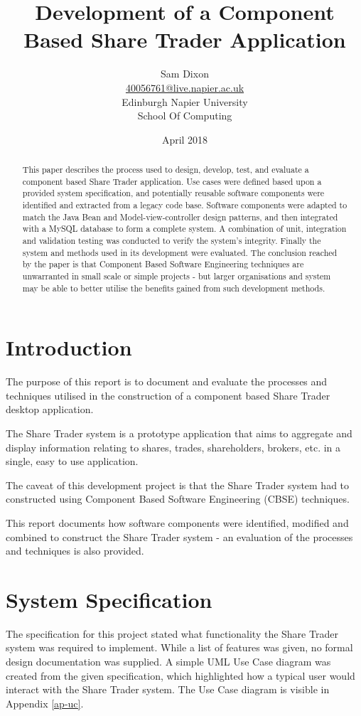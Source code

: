 \documentclass[12pt, a4paper,titlepage]{article}
\title{Development of a Component Based Share Trader Application}
\author{Sam Dixon
        \\\href{mailto:40056761@live.napier.ac.uk}{40056761@live.napier.ac.uk}
        \\Edinburgh Napier University
        \\School Of Computing
        \\}
\date{April 2018}
\begin{document}
\maketitle


\begin{abstract}
This paper describes the process used to design, develop, test, and evaluate
a component based Share Trader application.
Use cases were defined based upon a provided system specification, and
potentially reusable software components were identified and extracted from a
legacy code base.
Software components were adapted to match the Java Bean and
Model-view-controller design patterns, and then integrated with a MySQL
database to form a complete system.
A combination of unit, integration and validation testing was conducted to
verify the system's integrity.
Finally the system and methods used in its development were evaluated.
The conclusion reached by the paper is that Component Based Software
Engineering techniques are unwarranted in small scale or simple projects - but
larger organisations and system may be able to better utilise the benefits
gained from such development methods.
\end{abstract}


\tableofcontents
\newpage


\section{Introduction}
The purpose of this report is to document and evaluate the processes and
techniques utilised in the construction of a component based Share Trader
desktop application.

The Share Trader system is a prototype application that aims to aggregate and
display information relating to shares, trades, shareholders, brokers, etc. in
a single, easy to use application. 

The caveat of this development project is that the Share Trader system had to
constructed using Component Based Software Engineering (CBSE) techniques.

This report documents how software components were identified, modified and
combined to construct the Share Trader system - an evaluation of the processes
and techniques is also provided.


\section{System Specification}
The specification for this project stated what functionality the Share Trader
system was required to implement.
While a list of features was given, no formal design documentation was
supplied.
A simple UML Use Case diagram was created from the given specification, which
highlighted how a typical user would interact with the
Share Trader system.
The Use Case diagram is visible in Appendix \ref{ap-uc}.
\end{document}

